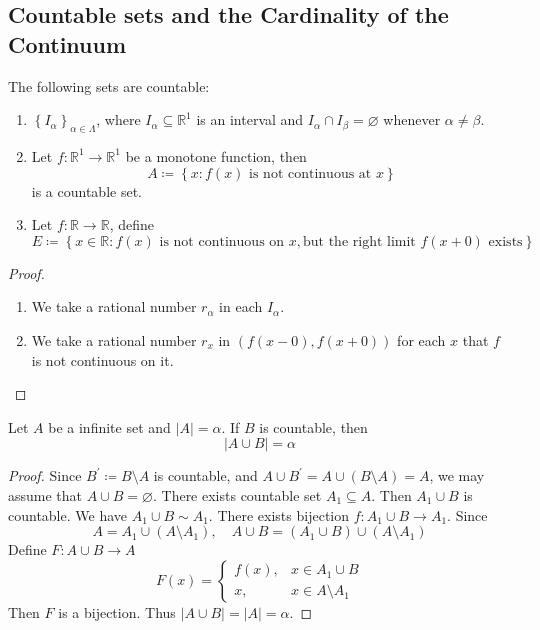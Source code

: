 \documentclass[../main.tex]{subfiles}
\begin{document}
\subsection{Countable sets and the Cardinality of the Continuum}

\begin{example}{}{}
    The following sets are countable: 
    \begin{enumerate}
        \item \(  \left\{ I_{\alpha } \right\}_{\alpha  \in  \Lambda }  \), where \(  I_{\alpha }\subseteq \mathbb{R} ^{1}  \) is an interval and \(  I_{\alpha }\cap I_{\beta }= \varnothing  \) whenever \(  \alpha \neq \beta   \).
        \item Let \(  f:\mathbb{R} ^{1}\to \mathbb{R} ^{1}  \) be a monotone function, then \[
        A\coloneqq \left\{ x:f\left( x \right)\text{ is not continuous at }x  \right\}
        \] is a countable set.     
        \item Let \(  f: \mathbb{R} \to \mathbb{R}   \), define \[
        E\coloneqq \left\{ x\in \mathbb{R} : f\left( x \right) \text{ is not continuous on }x,\text{but the right limit }f\left( x+ 0 \right)\text{ exists}   \right\}
        \] 
    \end{enumerate}
    
\end{example}
\begin{proof}
    \begin{enumerate}
        \item We take a rational number \(  r_{\alpha }  \) in each \(  I_{\alpha }  \).
        \item We take a rational number \(  r_{x}  \) in \(  \left( f\left( x-0 \right), f\left( x+ 0 \right)   \right)   \) for each \(  x  \) that \(  f  \) is not continuous on it.      
    \end{enumerate}
    
\end{proof}

\begin{theorem}{}{}
    Let \(  A  \) be a infinite set and \(  \left| A \right|= \alpha    \). If \(  B  \) is countable, then \[
    \left| A\cup B \right|= \alpha  
    \]   
\end{theorem}
\begin{proof}
    Since \(  B^{\prime} \coloneqq B\setminus A  \) is countable, and \(  A\cup B^{\prime}= A\cup \left( B\setminus A \right)= A    \), we may assume that \(  A\cup B= \varnothing  \).   There exists countable set \(  A_1\subseteq A  \). Then \(  A_1\cup B  \) is countable. We have \(  A_1\cup B\sim A_1  \). There exists bijection \(  f:A_1\cup B\to A_1  \). Since \[
    A= A_1\cup \left( A\setminus A_1 \right),\quad A\cup B= \left( A_1\cup B \right)\cup \left( A\setminus A_1 \right)   
    \]Define \(  F:A\cup B\to A   \)  \[
    F\left( x \right)= \begin{cases} f\left( x \right),&x \in A_1\cup B \\ 
     x,&x \in  A\setminus A_1   \end{cases}  
    \]     Then \(  F  \) is a bijection. Thus \(  \left| A\cup B \right|= \left| A \right|= \alpha     \). 
\end{proof}
\end{document}
